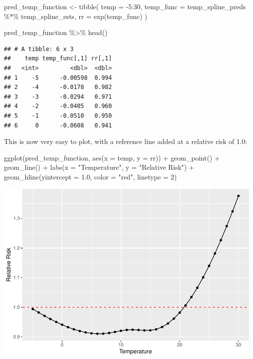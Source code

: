 \documentclass[
]{book}
\newenvironment{Shaded}{\begin{snugshade}}{\end{snugshade}}
\newcommand{\AttributeTok}[1]{\textcolor[rgb]{0.77,0.63,0.00}{#1}}
\newcommand{\DecValTok}[1]{\textcolor[rgb]{0.00,0.00,0.81}{#1}}
\newcommand{\FloatTok}[1]{\textcolor[rgb]{0.00,0.00,0.81}{#1}}
\newcommand{\FunctionTok}[1]{\textcolor[rgb]{0.00,0.00,0.00}{#1}}
\newcommand{\NormalTok}[1]{#1}
\newcommand{\OtherTok}[1]{\textcolor[rgb]{0.56,0.35,0.01}{#1}}
\newcommand{\SpecialCharTok}[1]{\textcolor[rgb]{0.00,0.00,0.00}{#1}}
\newcommand{\StringTok}[1]{\textcolor[rgb]{0.31,0.60,0.02}{#1}}
\begin{document}
\begin{Shaded}
\begin{Highlighting}[]
\NormalTok{pred\_temp\_function }\OtherTok{\textless{}{-}} \FunctionTok{tibble}\NormalTok{(}
  \AttributeTok{temp =} \SpecialCharTok{{-}}\DecValTok{5}\SpecialCharTok{:}\DecValTok{30}\NormalTok{, }
  \AttributeTok{temp\_func =}\NormalTok{ temp\_spline\_preds }\SpecialCharTok{\%*\%}\NormalTok{ temp\_spline\_ests,}
  \AttributeTok{rr =} \FunctionTok{exp}\NormalTok{(temp\_func)}
\NormalTok{)}

\NormalTok{pred\_temp\_function }\SpecialCharTok{\%\textgreater{}\%} 
  \FunctionTok{head}\NormalTok{()}
\end{Highlighting}
\end{Shaded}

\begin{verbatim}
## # A tibble: 6 x 3
##    temp temp_func[,1] rr[,1]
##   <int>         <dbl>  <dbl>
## 1    -5      -0.00598  0.994
## 2    -4      -0.0178   0.982
## 3    -3      -0.0294   0.971
## 4    -2      -0.0405   0.960
## 5    -1      -0.0510   0.950
## 6     0      -0.0608   0.941
\end{verbatim}

This is now very easy to plot, with a reference line added at a relative risk of 1.0:

\begin{Shaded}
\begin{Highlighting}[]
\FunctionTok{ggplot}\NormalTok{(pred\_temp\_function, }\FunctionTok{aes}\NormalTok{(}\AttributeTok{x =}\NormalTok{ temp, }\AttributeTok{y =}\NormalTok{ rr)) }\SpecialCharTok{+} 
  \FunctionTok{geom\_point}\NormalTok{() }\SpecialCharTok{+} 
  \FunctionTok{geom\_line}\NormalTok{() }\SpecialCharTok{+} 
  \FunctionTok{labs}\NormalTok{(}\AttributeTok{x =} \StringTok{"Temperature"}\NormalTok{, }
       \AttributeTok{y =} \StringTok{"Relative Risk"}\NormalTok{) }\SpecialCharTok{+} 
  \FunctionTok{geom\_hline}\NormalTok{(}\AttributeTok{yintercept =} \FloatTok{1.0}\NormalTok{, }\AttributeTok{color =} \StringTok{"red"}\NormalTok{, }\AttributeTok{linetype =} \DecValTok{2}\NormalTok{)}
\end{Highlighting}
\end{Shaded}

\includegraphics{adv_epi_analysis_files/figure-latex/unnamed-chunk-73-1.pdf}
\end{document}
